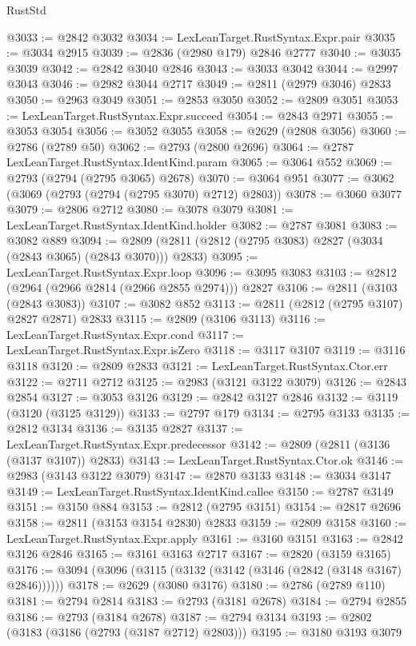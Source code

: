 \begin{lexlean}{RustStd}
\begin{coremodule}
@3033 := @2842 @3032
@3034 := LexLeanTarget.RustSyntax.Expr.pair
@3035 := @3034 @2915
@3039 := @2836 (@2980 @179) @2846 @2777
@3040 := @3035 @3039
@3042 := @2842 @3040 @2846
@3043 := @3033 @3042
@3044 := @2997 @3043
@3046 := @2982 @3044 @2717
@3049 := @2811 (@2979 @3046) @2833
@3050 := @2963 @3049
@3051 := @2853 @3050
@3052 := @2809 @3051
@3053 := LexLeanTarget.RustSyntax.Expr.succeed
@3054 := @2843 @2971
@3055 := @3053 @3054
@3056 := @3052 @3055
@3058 := @2629 (@2808 @3056)
@3060 := @2786 (@2789 @50)
@3062 := @2793 (@2800 @2696)
@3064 := @2787 LexLeanTarget.RustSyntax.IdentKind.param
@3065 := @3064 @552
@3069 := @2793 (@2794 (@2795 @3065) @2678)
@3070 := @3064 @951
@3077 := @3062 (@3069 (@2793 (@2794 (@2795 @3070) @2712) @2803))
@3078 := @3060 @3077
@3079 := @2806 @2712
@3080 := @3078 @3079
@3081 := LexLeanTarget.RustSyntax.IdentKind.holder
@3082 := @2787 @3081
@3083 := @3082 @889
@3094 := @2809 (@2811 (@2812 (@2795 @3083) @2827 (@3034 (@2843 @3065) (@2843 @3070))) @2833)
@3095 := LexLeanTarget.RustSyntax.Expr.loop
@3096 := @3095 @3083
@3103 := @2812 (@2964 (@2966 @2814 (@2966 @2855 @2974))) @2827
@3106 := @2811 (@3103 (@2843 @3083))
@3107 := @3082 @852
@3113 := @2811 (@2812 (@2795 @3107) @2827 @2871) @2833
@3115 := @2809 (@3106 @3113)
@3116 := LexLeanTarget.RustSyntax.Expr.cond
@3117 := LexLeanTarget.RustSyntax.Expr.isZero
@3118 := @3117 @3107
@3119 := @3116 @3118
@3120 := @2809 @2833
@3121 := LexLeanTarget.RustSyntax.Ctor.err
@3122 := @2711 @2712
@3125 := @2983 (@3121 @3122 @3079)
@3126 := @2843 @2854
@3127 := @3053 @3126
@3129 := @2842 @3127 @2846
@3132 := @3119 (@3120 (@3125 @3129))
@3133 := @2797 @179
@3134 := @2795 @3133
@3135 := @2812 @3134
@3136 := @3135 @2827
@3137 := LexLeanTarget.RustSyntax.Expr.predecessor
@3142 := @2809 (@2811 (@3136 (@3137 @3107)) @2833)
@3143 := LexLeanTarget.RustSyntax.Ctor.ok
@3146 := @2983 (@3143 @3122 @3079)
@3147 := @2870 @3133
@3148 := @3034 @3147
@3149 := LexLeanTarget.RustSyntax.IdentKind.callee
@3150 := @2787 @3149
@3151 := @3150 @884
@3153 := @2812 (@2795 @3151)
@3154 := @2817 @2696
@3158 := @2811 (@3153 @3154 @2830) @2833
@3159 := @2809 @3158
@3160 := LexLeanTarget.RustSyntax.Expr.apply
@3161 := @3160 @3151
@3163 := @2842 @3126 @2846
@3165 := @3161 @3163 @2717
@3167 := @2820 (@3159 @3165)
@3176 := @3094 (@3096 (@3115 (@3132 (@3142 (@3146 (@2842 (@3148 @3167) @2846))))))
@3178 := @2629 (@3080 @3176)
@3180 := @2786 (@2789 @110)
@3181 := @2794 @2814
@3183 := @2793 (@3181 @2678)
@3184 := @2794 @2855
@3186 := @2793 (@3184 @2678)
@3187 := @2794 @3134
@3193 := @2802 (@3183 (@3186 (@2793 (@3187 @2712) @2803)))
@3195 := @3180 @3193 @3079

\end{coremodule}
\end{lexlean}

